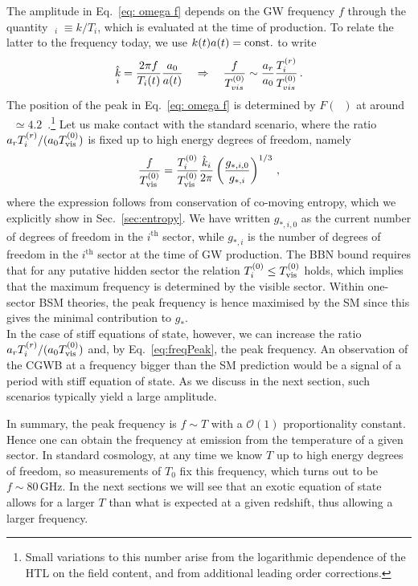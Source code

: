 \documentclass[a4paper,11pt]{article}
\DeclareMathOperator{\hk}{\hat{\mathit{k}}}
\newcommand{\dof}[1]{g_{*,\tiny{#1}}}
\newcommand{\tem}[2]{T_{\tiny{#1}}^{(#2)}}
\newcommand{\lr}[1]{\left(#1\right)}
\begin{document}
The amplitude in Eq.~\eqref{eq: omega f} depends on the GW frequency $f$ through the quantity $\hk_i\equiv k/T_i$, which is evaluated at the time of production. To relate the latter to the frequency today, we use $k(t)a(t)=\rm const.$ to write
\begin{equation}\label{eq:freqPeak} 
    \hk_i=  \frac{2 \pi f}{T_i(t)} \frac{a_0}{a(t)} \quad \Rightarrow\quad \frac{f}{\tem{vis}{0}}\sim \frac{a_{r}}{a_0} \frac{\tem{i}{r}}{\tem{vis}{0}}\, .
\end{equation}
The position of the peak in Eq.~\eqref{eq: omega f} is determined by $F(\hk)$ at around $\hk \simeq 4.2$~\cite{Ringwald:2020ist}.\footnote{Small variations to this number arise from the logarithmic dependence of the HTL on the field content, and from additional leading order corrections.} 
Let us make contact with the standard scenario, where the ratio 
$a_{r}\tem{i}{r}/(a_0\tem{\text{vis}}{0})$ 
is fixed up to high energy degrees of freedom, namely
\begin{equation}\label{eq: freq}
    \frac{f}{\tem{\text{vis}}{0}}=\frac{\tem{i}{0}}{\tem{\text{vis}}{0}}\frac{\hk_i}{2\pi}\lr{\frac{\dof{i,0}}{\dof{i}}}^{1/3}\,,
\end{equation}
where the expression follows from conservation of co-moving entropy, which we explicitly show in Sec.~\ref{sec:entropy}. We have written $g_{*,i,0}$ as the current number of degrees of freedom in the $i^{\text{th}}$ sector, while $g_{*,i}$ is the number of degrees of freedom in the $i^{\text{th}}$ sector at the time of GW production.
The BBN bound requires that for any putative hidden sector the relation $\tem{i}{0}\leq\tem{\text{vis}}{0}$ holds, which implies that the maximum frequency is determined by the visible sector. Within one-sector BSM theories, the peak frequency is hence maximised by the SM since this gives the minimal contribution to $g_*$.\\

In the case of stiff equations of state, however, we can increase the ratio $ a_{r}\tem{i}{r}/(a_0\tem{\text{vis}}{0})$ and, by Eq.~\eqref{eq:freqPeak}, the peak frequency. An observation of the CGWB at a frequency bigger than the SM prediction would be a signal of a period with stiff equation of state. As we discuss in the next section, such scenarios typically yield a large amplitude.

In summary, the peak frequency is $f\sim T$ with a $\mathcal{O}(1)$ proportionality constant. Hence one can obtain the frequency at emission from the temperature of a given sector. In standard cosmology, at any time we know $T$ up to high energy degrees of freedom, so measurements of $T_0$ fix this frequency, which turns out to be $f \sim 80 \, \text{GHz}$. In the next sections we will see that an exotic equation of state allows for a larger $T$ than what is expected at a given redshift, thus allowing a larger frequency.
\end{document}
